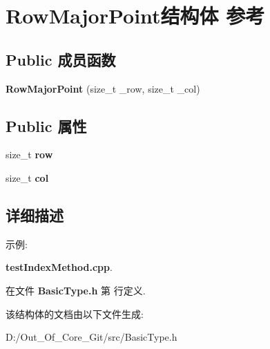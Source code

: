 \section{Row\-Major\-Point结构体 参考}
\label{struct_row_major_point}
\subsection*{Public 成员函数}
\begin{DoxyCompactItemize}
\item 
{\bfseries Row\-Major\-Point} (size\-\_\-t \-\_\-row, size\-\_\-t \-\_\-col)\label{struct_row_major_point_a842420c69222b1e6dc1bbdabe9a04d53}

\end{DoxyCompactItemize}
\subsection*{Public 属性}
\begin{DoxyCompactItemize}
\item 
size\-\_\-t {\bfseries row}\label{struct_row_major_point_ab37a563a22e1827a13b4dbaea2d2ce46}

\item 
size\-\_\-t {\bfseries col}\label{struct_row_major_point_a7c04e4879b6f83c7be6061302c1c7f15}

\end{DoxyCompactItemize}


\subsection{详细描述}
\begin{Desc}
\item[示例\-: ]\par
{\bf test\-Index\-Method.\-cpp}.\end{Desc}


在文件 {\bf Basic\-Type.\-h} 第  行定义.



该结构体的文档由以下文件生成\-:\begin{DoxyCompactItemize}
\item 
D\-:/\-Out\-\_\-\-Of\-\_\-\-Core\-\_\-\-Git/src/Basic\-Type.\-h\end{DoxyCompactItemize}
